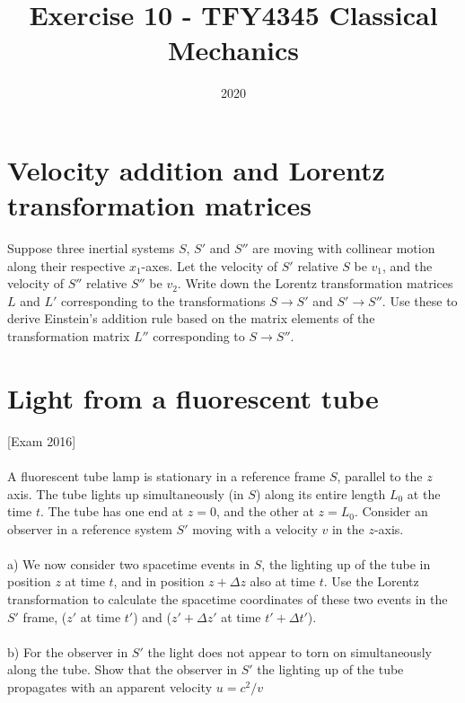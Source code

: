 \documentclass{article}
\title{Exercise 10 - TFY4345 Classical Mechanics}
\date{2020}
\begin{document}
    \maketitle
    \section{Velocity addition and Lorentz transformation matrices}
    Suppose three inertial systems $S, \, S'$ and $S''$ are moving with collinear motion along their respective $x_1$-axes. Let the velocity of $S'$ relative $S$ be $v_1$, and the velocity of $S''$ relative $S''$ be $v_2$. Write down the Lorentz transformation matrices $L$ and $L'$ corresponding to the transformations $S \rightarrow S'$ and $S' \rightarrow S''$. Use these to derive Einstein's addition rule based on the matrix elements of the transformation matrix $L''$ corresponding to $S \rightarrow S''$. \newline {} 
    \section{Light from a fluorescent tube}
        [Exam 2016] \\ \\
        A fluorescent tube lamp is stationary in a reference frame $S$, parallel to the $z$ axis. The tube lights up simultaneously (in $S$) along its entire length $L_0$ at the time $t$. The tube has one end at $z=0$, and the other at $z = L_0$. Consider an observer in a reference system $S'$ moving with a velocity $v$ in the $z$-axis. \\ \\
        a) We now consider two spacetime events in $S$, the lighting up of the tube in position $z$ at time $t$, and in position $z + \Delta z$ also at time $t$. Use the Lorentz transformation to calculate the spacetime coordinates of these two events in the $S'$ frame, ($z'$ at time $t'$) and ($z' + \Delta z'$ at time $t' + \Delta t'$). \\ \\
        b) For the observer in $S'$ the light does not appear to torn on simultaneously along the tube. Show that the observer in $S'$ the lighting up of the tube propagates with an apparent velocity $u = c^2/v$
\end{document}
